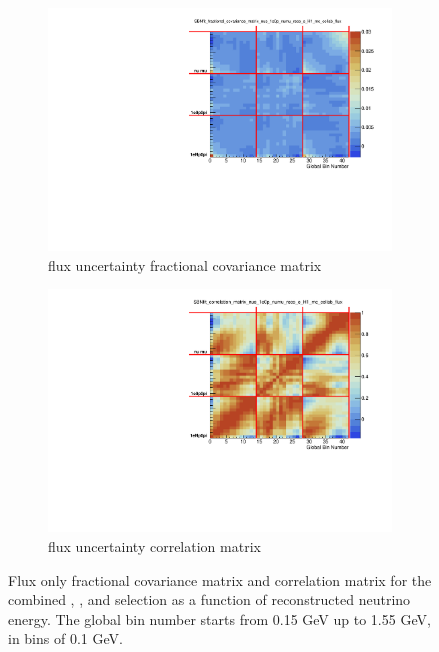 \begin{figure}[ht] 
\begin{center}
    \begin{subfigure}[b]{0.48\textwidth}
    \centering
    \includegraphics[width=1.00\textwidth]{Systematics/CovarianceMatrices/SBNfit_fractional_covariance_matrix_nue_1e0p_numu_reco_e_H1_mc_collab_flux_collapsed.pdf}
    \caption{flux uncertainty fractional covariance matrix}
    \end{subfigure}
    \begin{subfigure}[b]{0.48\textwidth}
    \centering
    \includegraphics[width=1.00\textwidth]{Systematics/CovarianceMatrices/SBNfit_correlation_matrix_nue_1e0p_numu_reco_e_H1_mc_collab_flux_collapsed.pdf}
    \caption{flux uncertainty correlation matrix}
    \end{subfigure}
\caption{\label{fig:fluxmatrices} Flux only fractional covariance matrix and correlation matrix for the combined \npsel, \zpsel, and \numu selection as a function of reconstructed neutrino energy. The global bin number starts from 0.15 GeV up to 1.55 GeV, in bins of 0.1 GeV.}
\end{center}
\end{figure}

